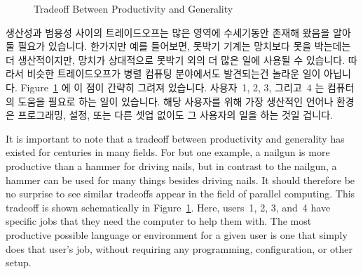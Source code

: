 \begin{figure}[tb]
\centering
{}
\caption{Tradeoff Between Productivity and Generality}
\label{fig:intro:Tradeoff Between Productivity and Generality}
\end{figure}

생산성과 범용성 사이의 트레이드오프는 많은 영역에 수세기동안 존재해 왔음을
알아둘 필요가 있습니다.
한가지만 예를 들어보면, 못박기 기계는 망치보다 못을 박는데는 더 생산적이지만,
망치가 상대적으로 못박기 외의 더 많은 일에 사용될 수 있습니다.
따라서 비슷한 트레이드오프가 병렬 컴퓨팅 분야에서도 발견되는건 놀라운 일이
아닙니다.
Figure~\ref{fig:intro:Tradeoff Between Productivity and Generality}
에 이 점이 간략히 그려져 있습니다.
사용자~1, 2, 3, 그리고~4 는 컴퓨터의 도움을 필요로 하는 일이 있습니다.
해당 사용자를 위해 가장 생산적인 언어나 환경은 프로그래밍, 설정, 또는 다른 셋업
없이도 그 사용자의 일을 하는 것일 겁니다.

\iffalse

It is important to note that a tradeoff between productivity and
generality has existed for centuries in many fields.
For but one example, a nailgun is more productive than a hammer for
driving nails, but in contrast to the nailgun, a hammer can be used for
many things besides driving nails.
It should therefore be no surprise to see similar tradeoffs
appear in the field of parallel computing.
This tradeoff is shown schematically in
Figure~\ref{fig:intro:Tradeoff Between Productivity and Generality}.
Here, users~1, 2, 3, and~4 have specific jobs that they need the computer
to help them with.
The most productive possible language or environment for a given user is one
that simply does that user's job, without requiring any programming,
configuration, or other setup.

